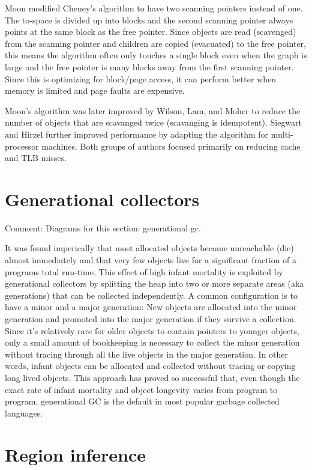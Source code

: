 \documentclass[a4paper,oneside]{memoir}
\newcommand{\makecomment}[1]{{\color{red} Comment: #1}}
\begin{document}
Moon modified Cheney's algorithm to have two scanning pointers instead of one.
The to-space is divided up into blocks and the second scanning pointer always
points at the same block as the free pointer. Since objects are read (scavenged)
from the scanning pointer and children are copied (evacuated) to the free pointer,
this means the algorithm often only touches a single block even when the graph
is large and the free pointer is many blocks away from the first scanning pointer.
Since this is optimizing for block/page access, it can perform better when memory
is limited and page faults are expensive.

Moon's algorithm was later improved by Wilson, Lam, and Moher to reduce the
number of objects that are scavanged twice (scavanging is idempotent). Siegwart
and Hirzel further improved performance by adapting the algorithm for
multi-processor machines. Both groups of authors focused primarily on reducing
cache and TLB misses.

\section{Generational collectors}
\makecomment{Diagrams for this section: generational gc.}

It was found imperically that most allocated objects become unreachable (die)
almost immediately and that very few objects live for a significant fraction
of a programs total run-time. This effect of high infant mortality is exploited
by generational collectors by splitting the heap into two or more separate areas
(aka generations) that can be collected independently. A common configuration is
to have a minor and a major generation: New objects are allocated into the minor
generation and promoted into the major generation if they survive a collection.
Since it's relatively rare for older objects to contain pointers to younger
objects, only a small amount of bookkeeping is necessary to collect the minor
generation without tracing through all the live objects in the major generation.
In other words, infant objects can be allocated and collected without tracing or
copying long lived objects. This approach has proved so successful that, even
though the exact rate of infant mortality and object longevity varies from
program to program, generational GC is the default in most popular garbage
collected languages.

\section{Region inference}
\end{document}
